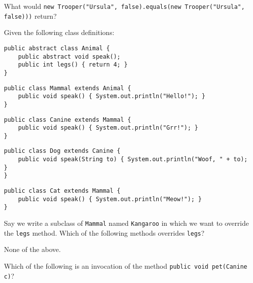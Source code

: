 \documentclass[addpoints,9pt]{exam}
\begin{document}
\begin{questions}
\question[3] What would {\tt new Trooper("Ursula", false).equals(new Trooper("Ursula", false)))} return?

\begin{choices}
\end{choices}




\newpage





Given the following class definitions:
\begin{lstlisting}
public abstract class Animal {
    public abstract void speak();
    public int legs() { return 4; }
}
\end{lstlisting}

\begin{lstlisting}
public class Mammal extends Animal {
    public void speak() { System.out.println("Hello!"); }
}
\end{lstlisting}

\begin{lstlisting}
public class Canine extends Mammal {
    public void speak() { System.out.println("Grr!"); }
}
\end{lstlisting}


\begin{lstlisting}
public class Dog extends Canine {
    public void speak(String to) { System.out.println("Woof, " + to); }
}
\end{lstlisting}

\begin{lstlisting}
public class Cat extends Mammal {
    public void speak() { System.out.println("Meow!"); }
}
\end{lstlisting}

\question[3] Say we write a subclass of {\tt Mammal} named {\tt Kangaroo} in which we want to override the {\tt legs} method.  Which of the following methods overrides {\tt legs}?
\begin{choices}
\correctchoice None of the above.
\end{choices}

\question[3] Which of the following is an invocation of the method {\tt public void pet(Canine c)}?
\begin{choices}
\end{choices}



\end{questions}
\end{document}

